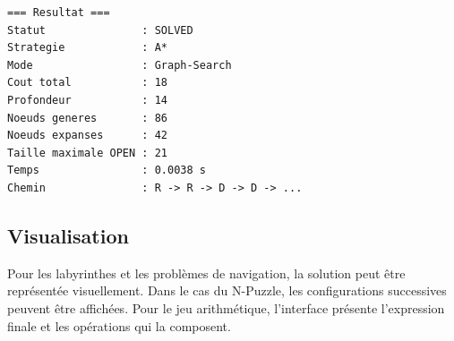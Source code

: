 \begin{lstlisting}[caption={Exemple de résultat affiché.}]
=== Resultat ===
Statut               : SOLVED
Strategie            : A*
Mode                 : Graph-Search
Cout total           : 18
Profondeur           : 14
Noeuds generes       : 86
Noeuds expanses      : 42
Taille maximale OPEN : 21
Temps                : 0.0038 s
Chemin               : R -> R -> D -> D -> ...
\end{lstlisting}

\subsection{Visualisation}

Pour les labyrinthes et les problèmes de navigation, la solution peut être
représentée visuellement. Dans le cas du N-Puzzle, les configurations
successives peuvent être affichées. Pour le jeu arithmétique, l'interface
présente l'expression finale et les opérations qui la composent.